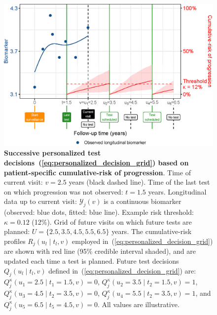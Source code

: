 \begin{figure}
\centerline{\includegraphics{images/schedule_explanation_102.eps}}
\caption{\textbf{Successive personalized test decisions~(\ref{eq:personalized_decision_grid}) based on patient-specific cumulative-risk of progression}. Time of current visit: $v=2.5$ years (black dashed line). Time of the last test on which progression was not observed: $t=1.5$ years. Longitudinal data up to current visit: $\mathcal{Y}_j(v)$ is a continuous biomarker (observed: blue dots, fitted: blue line). Example risk threshold: $\kappa=0.12$ (12\%). Grid of future visits on which future tests are planned: $U = \{2.5, 3.5, 4.5, 5.5, 6.5\}$ years. The cumulative-risk profiles $R_j(u_l \mid t_l, v)$ employed in~(\ref{eq:personalized_decision_grid}) are shown with red line (95\% credible interval shaded), and are updated each time a test is planned. Future test decisions $Q_j(u_l \mid t_l, v)$ defined in~(\ref{eq:personalized_decision_grid}) are: $Q_j^\kappa(u_1=2.5\mid t_1=1.5,v)=0$, $Q_j^\kappa(u_2=3.5\mid t_2=1.5,v)=1$, $Q_j^\kappa(u_3=4.5\mid t_2=3.5,v)=0$, $Q_j^\kappa(u_4=5.5\mid t_2=3.5,v)=1$, and $Q_j^\kappa(u_5=6.5\mid t_5=4.5,v)=0$. All values are illustrative.} 
\label{fig:schedule_explanation}
\end{figure}

